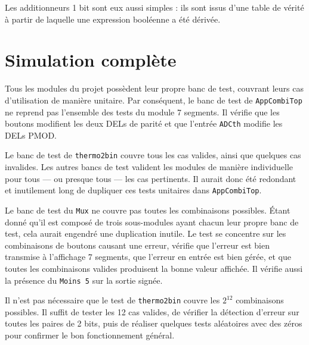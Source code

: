 \documentclass[a11paper]{article}
\begin{document}
Les additionneurs 1 bit sont eux aussi simples : ils sont issus d’une table
de vérité à partir de laquelle une expression booléenne a été dérivée.

\section{Simulation complète}

Tous les modules du projet possèdent leur propre banc de test, couvrant leurs
cas d’utilisation de manière unitaire. Par conséquent, le banc de test de
\texttt{AppCombiTop} ne reprend pas l’ensemble des tests du module 7
segments. Il vérifie que les boutons modifient les deux DELs de parité et que
l’entrée \texttt{ADCth} modifie les DELs PMOD.

Le banc de test de \texttt{thermo2bin} couvre tous les cas valides, ainsi que
quelques cas invalides. Les autres bancs de test valident les modules de
manière individuelle pour tous — ou presque tous — les cas pertinents. Il
aurait donc été redondant et inutilement long de dupliquer ces tests
unitaires dans \texttt{AppCombiTop}.

Le banc de test du \texttt{Mux} ne couvre pas toutes les combinaisons
possibles. Étant donné qu’il est composé de trois sous-modules ayant chacun
leur propre banc de test, cela aurait engendré une duplication inutile. Le
test se concentre sur les combinaisons de boutons causant une erreur, vérifie
que l’erreur est bien transmise à l’affichage 7 segments, que l’erreur en
entrée est bien gérée, et que toutes les combinaisons valides produisent la
bonne valeur affichée. Il vérifie aussi la présence du \texttt{Moins 5} sur
la sortie signée.

Il n’est pas nécessaire que le test de \texttt{thermo2bin} couvre les
$2^{12}$ combinaisons possibles. Il suffit de tester les 12 cas valides, de
vérifier la détection d’erreur sur toutes les paires de 2 bits, puis de
réaliser quelques tests aléatoires avec des zéros pour confirmer le bon
fonctionnement général.
\end{document}
